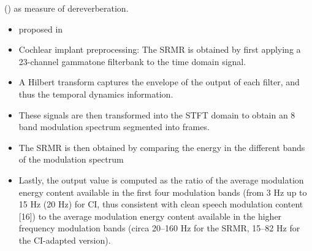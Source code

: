  (\DSRMR) as measure of dereverberation.
\begin{itemize}
    \item proposed in~
    \item Cochlear implant preprocessing: The SRMR is obtained by first applying a 23-channel gammatone filterbank to the time domain signal.
    \item A Hilbert transform captures the envelope of the output of each filter, and thus the temporal dynamics information.
    \item These signals are then transformed into the STFT domain to obtain an 8 band modulation spectrum segmented into frames.
    \item The SRMR is then obtained by comparing the energy in the different bands of the modulation spectrum
    \item Lastly, the output value is computed as the ratio of the average modulation energy content available in the first four modulation bands (from 3 Hz up to 15 Hz (20 Hz) for CI, thus consistent with clean speech modulation content [16])
         to the average modulation energy content available in the higher frequency modulation bands (circa 20–160 Hz for the SRMR, 15–82 Hz for the CI-adapted version).
\end{itemize}

